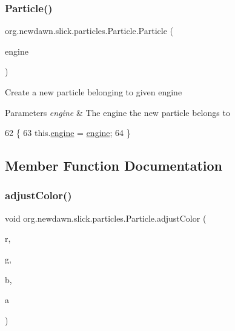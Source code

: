 \subsubsection{\texorpdfstring{Particle()}{Particle()}}
{\footnotesize\ttfamily org.\+newdawn.\+slick.\+particles.\+Particle.\+Particle (\begin{DoxyParamCaption}\item[{\mbox{\hyperlink{classorg_1_1newdawn_1_1slick_1_1particles_1_1_particle_system}{Particle\+System}}}]{engine }\end{DoxyParamCaption})\hspace{0.3cm}{\ttfamily [inline]}}

Create a new particle belonging to given engine


\begin{DoxyParams}{Parameters}
{\em engine} & The engine the new particle belongs to \\
\hline
\end{DoxyParams}

\begin{DoxyCode}
62                                            \{
63         this.\mbox{\hyperlink{classorg_1_1newdawn_1_1slick_1_1particles_1_1_particle_a92d857a3e2fba0ed564ad8e29ca3b81e}{engine}} = \mbox{\hyperlink{classorg_1_1newdawn_1_1slick_1_1particles_1_1_particle_a92d857a3e2fba0ed564ad8e29ca3b81e}{engine}};
64     \}
\end{DoxyCode}


\subsection{Member Function Documentation}
\mbox{\label{classorg_1_1newdawn_1_1slick_1_1particles_1_1_particle_af829fcadc2785440a4da6bbaf110ddee}} 
\subsubsection{\texorpdfstring{adjust\+Color()}{adjustColor()}\hspace{0.1cm}{\footnotesize\ttfamily [1/2]}}
{\footnotesize\ttfamily void org.\+newdawn.\+slick.\+particles.\+Particle.\+adjust\+Color (\begin{DoxyParamCaption}\item[{float}]{r,  }\item[{float}]{g,  }\item[{float}]{b,  }\item[{float}]{a }\end{DoxyParamCaption})\hspace{0.3cm}{\ttfamily [inline]}}

